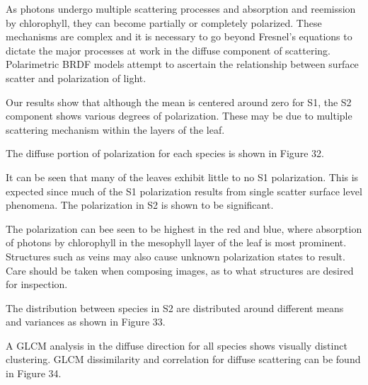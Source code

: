 As photons undergo multiple scattering processes and absorption and reemission by chlorophyll, they can become partially or completely polarized.  These mechanisms are complex and it is necessary to go beyond Fresnel’s equations to dictate the major processes at work in the diffuse component of scattering.  Polarimetric BRDF models attempt to ascertain the relationship between surface scatter and polarization of light.

Our results show that although the mean is centered around zero for S1, the S2 component shows various degrees of polarization.  These may be due to multiple scattering mechanism within the layers of the leaf.

The diffuse portion of polarization for each species is shown in Figure 32.
%
\begin{center}
\end{center}
%
It can be seen that many of the leaves exhibit little to no S1 polarization.  This is expected since much of the S1 polarization results from single scatter surface level phenomena.  The polarization in S2 is shown to be significant.

The polarization can bee seen to be highest in the red and blue, where absorption of photons by chlorophyll in the mesophyll layer of the leaf is most prominent.  Structures such as veins may also cause unknown polarization states to result.  Care should be taken when composing images, as to what structures are desired for inspection.

The distribution between species in S2 are distributed around different means and variances as shown in Figure 33.
%
\begin{center}
\end{center}
%
A GLCM analysis in the diffuse direction for all species shows visually distinct clustering.  GLCM dissimilarity and correlation for diffuse scattering can be found in Figure 34.
%
\begin{center}
\end{center}
%
